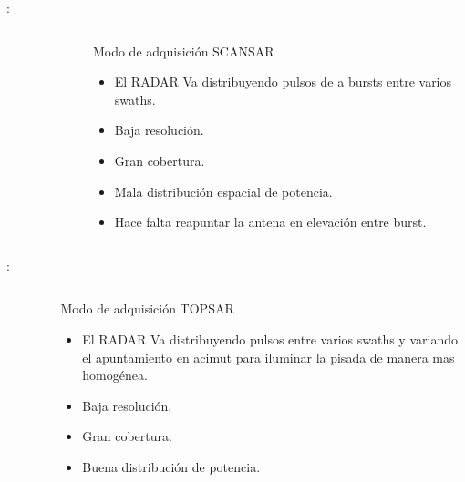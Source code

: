 \begin{frame}{\secname : \subsecname}
  \begin{columns}
    \begin{column}{0.5\textwidth}
       \begin{figure}
         \centering
         \label{}
       \end{figure}
    \end{column}
    \begin{column}{0.5\textwidth}  %
      \begin{block}{Modo de adquisición SCANSAR}
        \begin{itemize}
          \item El RADAR Va distribuyendo pulsos de a bursts entre varios swaths.
          \item Baja resolución.
          \item Gran cobertura.
          \item Mala distribución espacial de potencia.
          \item Hace falta reapuntar la antena en elevación entre burst.
        \end{itemize}
      \end{block}
    \end{column}
    \end{columns}
\end{frame}
\begin{frame}{\secname : \subsecname}
  \begin{columns}
    \begin{column}{0.5\textwidth}
       \begin{figure}
         \centering
         \label{}
       \end{figure}
    \end{column}
    \begin{column}{0.5\textwidth}  %
      \begin{block}{Modo de adquisición TOPSAR}
        \begin{itemize}
          \item El RADAR Va distribuyendo pulsos entre varios swaths y variando el apuntamiento en acimut para iluminar la pisada de manera mas homogénea.
          \item Baja resolución.
          \item Gran cobertura.
          \item Buena distribución de potencia.
        \end{itemize}
      \end{block}
    \end{column}
    \end{columns}
\end{frame}

